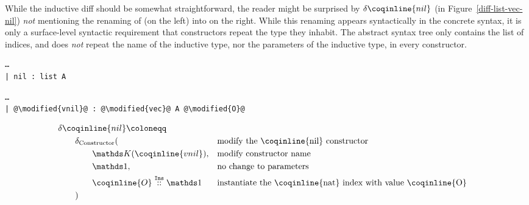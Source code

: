 While the inductive diff should be somewhat straightforward, the reader might be
surprised by $\delta\coqinline{nil}$ (in Figure~\ref{diff-list-vec-nil})
\emph{not} mentioning the renaming of  (on the left) into
 on the right.  While this renaming appears syntactically in the
concrete syntax, it is only a surface-level syntactic requirement that
constructors repeat the type they inhabit.  The abstract syntax tree only
contains the list of indices, and does \emph{not} repeat the name of the inductive
type, nor the parameters of the inductive type, in every constructor.

\begin{figure*}[!htp]

  \noindent%
  \begin{minipage}[t]{0.50\textwidth}
    \begin{verbatim}
…
| nil : list A
  \end{verbatim}
\end{minipage}%
\begin{minipage}[t]{0.50\textwidth}
  \begin{verbatim}
…
| @\modified{vnil}@ : @\modified{vec}@ A @\modified{O}@
  \end{verbatim}
\end{minipage}

  \vspace{2em}%

  \begin{align*}
& \delta\coqinline{nil} \coloneqq & && \\
& \qquad \deltaConstructor{} ( && \text{modify the \coqinline{nil} constructor} \\
& \qquad \qquad \MathReplace{\coqinline{vnil}}, && \text{modify constructor name} \\
& \qquad \qquad \MathSame{},                    && \text{no change to parameters} \\
& \qquad \qquad \MathIns{\coqinline{O}}{\MathSame{}}
  && \text{instantiate the \coqinline{nat} index with value \coqinline{O}} \\
& \qquad ) && \\
  \end{align*}

  \caption{Diff for our running example ( constructor only)}
  \label{diff-list-vec-nil}

\end{figure*}

